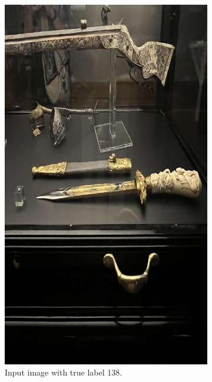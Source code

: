 \begin{figure}[h]
    \centering

    \begin{subfigure}[b]{0.4\textwidth}
        \centering
        \includegraphics[width=\textwidth]{img/138.jpg}
        \caption{Input image with true label 138.}
    \end{subfigure}
    \hfill
    \begin{subfigure}[b]{0.4\textwidth}
        \centering

\end{subfigure}
\end{figure}
